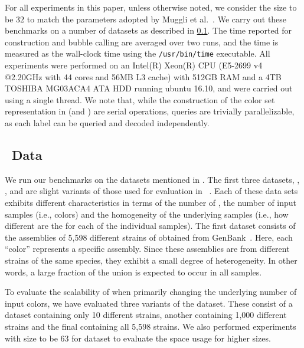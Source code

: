 For all experiments in this paper, unless otherwise noted, we consider the \kmer
size to be $32$ to match the parameters adopted by Muggli et
al.~\cite{MuggliBoNo17}. We carry out these benchmarks on a number of datasets
as described in \cref{subsec:data}. The time reported for construction and
bubble calling are averaged over two runs, and the time is measured as the
wall-clock time using the \texttt{/usr/bin/time} executable. All experiments
were performed on an Intel(R) Xeon(R) CPU (E5-2699 v4 @2.20GHz with 44 cores and
56MB L3 cache) with 512GB RAM and a 4TB TOSHIBA MG03ACA4 ATA HDD running ubuntu
16.10, and were carried out using a single thread. We note that, while the
construction of the color set representation in \system (and \vari) are serial
operations, queries are trivially parallelizable, as each label can be queried
and decoded independently.

\subsection{~Data}
\label{subsec:data}

We run our benchmarks on the datasets mentioned in .
The first three datasets, 
\ecoli, \plant, and \beefsafety are slight variants of those used for
evaluation in \vari~\cite{MuggliBoNo17}. Each of these data sets exhibits
different characteristics in terms of the number of \kmers, the number of input
samples (i.e., colors) and the homogeneity of the underlying samples (i.e., how
different are the \dbg for each of the individual samples).
%
The first dataset consists of the assemblies of 5,598 different strains of
\ecoli obtained from GenBank~\cite{o2015reference}. Here, each ``color''
represents a specific \ecoli assembly. Since these assemblies are from
different strains of the same species, they exhibit a small degree of
heterogeneity. In other words, a large fraction of the union \dbg is expected
to occur in all samples.

To evaluate the scalability of \system when primarily changing the underlying
number of input colors, we have evaluated three variants of the \ecoli dataset.
These consist of a dataset containing only 10 different strains, another
containing 1,000 different strains and the final containing all 5,598 strains.
We also performed experiments with \kmer size to be $63$ for 
dataset to evaluate the space usage for higher \kmer sizes.



